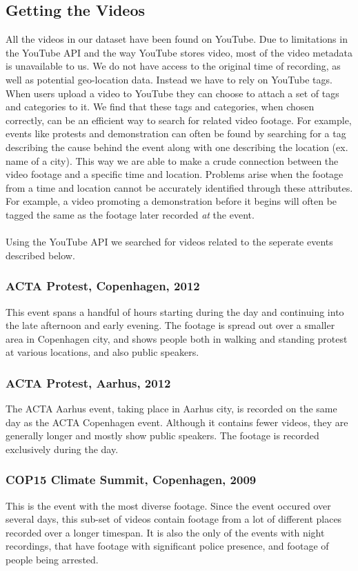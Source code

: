 \subsection{Getting the Videos}
%
All the videos in our dataset have been found on YouTube. Due to limitations in the YouTube API and the way YouTube stores video, most of the video metadata is unavailable to us. We do not have access to the original time of recording, as well as potential geo-location data. Instead we have to rely on YouTube tags. When users upload a video to YouTube they can choose to attach a set of tags and categories to it. We find that these tags and categories, when chosen correctly, can be an efficient way to search for related video footage. For example, events like protests and demonstration can often be found by searching for a tag describing the cause behind the event along with one describing the location (ex. name of a city). This way we are able to make a crude connection between the video footage and a specific time and location. Problems arise when the footage from a time and location cannot be accurately identified through these attributes. For example, a video promoting a demonstration before it begins will often be tagged the same as the footage later recorded \emph{at} the event.\\\\
%
Using the YouTube API we searched for videos related to the seperate events described below.
%
\subsubsection{ACTA Protest, Copenhagen, 2012}
%
This event spans a handful of hours starting during the day and continuing into the late afternoon and early evening. The footage is spread out over a smaller area in Copenhagen city, and shows people both in walking and standing protest at various locations, and also public speakers.
%
\subsubsection{ACTA Protest, Aarhus, 2012}
%
The ACTA Aarhus event, taking place in Aarhus city, is recorded on the same day as the ACTA Copenhagen event. Although it contains fewer videos, they are generally longer and mostly show public speakers. The footage is recorded exclusively during the day.
%
\subsubsection{COP15 Climate Summit, Copenhagen, 2009}
%
This is the event with the most diverse footage. Since the event occured over several days, this sub-set of videos contain footage from a lot of different places recorded over a longer timespan. It is also the only of the events with night recordings, that have footage with significant police presence, and footage of people being arrested.
%
